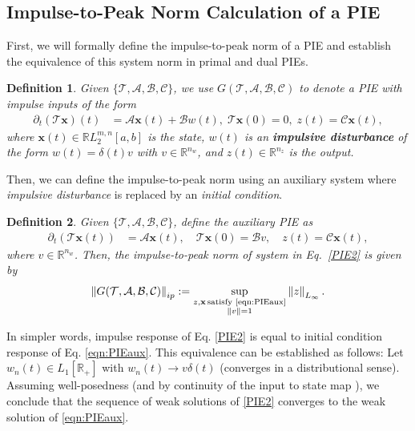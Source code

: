 \documentclass[letterpaper, 10 pt, conference]{ieeeconf}
\newtheorem{definition}{Definition}
\newcommand{\R}{\mathbb{R}}
\newcommand{\mcl}[1]{\mathcal{#1}}
\newcommand{\mbf}[1]{\mathbf{#1}}
\newcommand{\norm}[1]{\left\lVert #1 \right\rVert}
\theoremstyle{definition}
\begin{document}



\subsection{Impulse-to-Peak Norm Calculation of a PIE}
First, we will formally define the impulse-to-peak norm of a PIE and establish the equivalence of this system norm in primal and dual PIEs. 
\begin{definition}\label{def:ip-normsystem}
    Given $\{\mcl T, \mcl A, \mcl B, \mcl C\}$, we use $G(\mcl T, \mcl A,\mcl B,\mcl C)$ to denote a PIE with impulse inputs of the form
\begin{align}
\partial_t (\mcl T \mbf x)(t)&= \mcl A \mbf x(t)\!+\!\mcl B w(t),\; \mcl T\mbf x(0) =0,\; z(t)=\mcl C \mbf x(t), \label{PIE2}
\end{align}
where $\mbf x(t) \in \R L_2^{m,n}[a,b]$ is the state, $w(t)$ is an \textbf{impulsive disturbance} of the form $w(t) = \delta(t)v$ with $v \in \mathbb{R}^{n_w}$, and $z(t) \in \R^{n_z}$ is the output.
\end{definition} Then, we can define the impulse-to-peak norm using an auxiliary system where \textit{impulsive disturbance} is replaced by an \textit{initial condition}. 
\begin{definition}\label{def:h2norm}
Given $\{\mcl T, \mcl A, \mcl B, \mcl C\}$, define the auxiliary PIE as 
\begin{align}\label{eqn:PIEaux}
\partial_t (\mcl T \mbf x(t))&= \mcl A \mbf x(t),\quad \mcl T \mbf{x}(0) =\mcl{B} v,\quad z(t)=\mcl C \mbf x(t),
\end{align}
where $v \in \R^{n_w}$. Then, the impulse-to-peak norm of system in Eq.~\eqref{PIE2} is given by
\[
 \norm{G(\mcl T, \mcl A,\mcl B,\mcl C)}_{ip}:=\sup_{\substack{z,\mbf x\, \text{satisfy~\eqref{eqn:PIEaux}}\\ \norm{v}=1}} \norm{z}_{L_\infty}.
\]
\end{definition}
\noindent In simpler words, impulse response of Eq. \eqref{PIE2} is equal to initial condition response of Eq. \eqref{eqn:PIEaux}. This equivalence can be established as follows: Let $w_n(t)\in L_1[\R_+]$ with $w_n(t)\to v\delta(t)$ (converges in a distributional sense). Assuming well-posedness (and by continuity of the input to state map \cite[Lemma 3.1.5]{curtain2012introduction}), we conclude that the sequence of weak solutions of \eqref{PIE2} converges to the weak solution of \eqref{eqn:PIEaux}.
\end{document}
